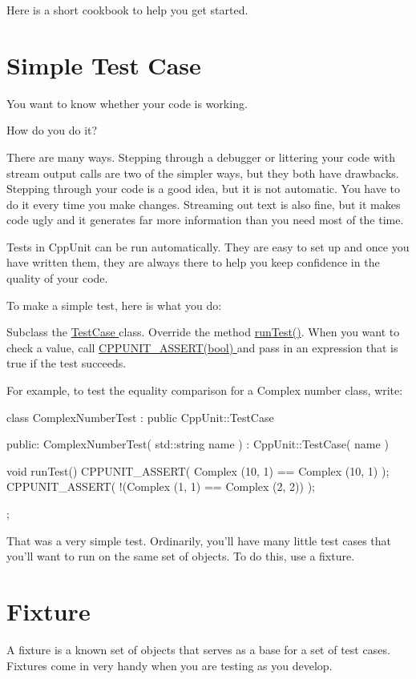 Here is a short cookbook to help you get started.\hypertarget{cppunit_cookbook_simple_test_case}{}\section{Simple Test Case}\label{cppunit_cookbook_simple_test_case}
You want to know whether your code is working.

How do you do it?

There are many ways. Stepping through a debugger or littering your code with stream output calls are two of the simpler ways, but they both have drawbacks. Stepping through your code is a good idea, but it is not automatic. You have to do it every time you make changes. Streaming out text is also fine, but it makes code ugly and it generates far more information than you need most of the time.

Tests in CppUnit can be run automatically. They are easy to set up and once you have written them, they are always there to help you keep confidence in the quality of your code.

To make a simple test, here is what you do:

Subclass the \hyperlink{}{TestCase } class. Override the method \hyperlink{}{runTest()}. When you want to check a value, call \hyperlink{}{CPPUNIT\_\-ASSERT(bool) } and pass in an expression that is true if the test succeeds.

For example, to test the equality comparison for a Complex number class, write:


\begin{DoxyCode}
class ComplexNumberTest : public CppUnit::TestCase { 
public: 
  ComplexNumberTest( std::string name ) : CppUnit::TestCase( name ) {}
  
  void runTest() {
    CPPUNIT_ASSERT( Complex (10, 1) == Complex (10, 1) );
    CPPUNIT_ASSERT( !(Complex (1, 1) == Complex (2, 2)) );
  }
};
\end{DoxyCode}


That was a very simple test. Ordinarily, you'll have many little test cases that you'll want to run on the same set of objects. To do this, use a fixture.\hypertarget{cppunit_cookbook_fixture}{}\section{Fixture}\label{cppunit_cookbook_fixture}
A fixture is a known set of objects that serves as a base for a set of test cases. Fixtures come in very handy when you are testing as you develop.

